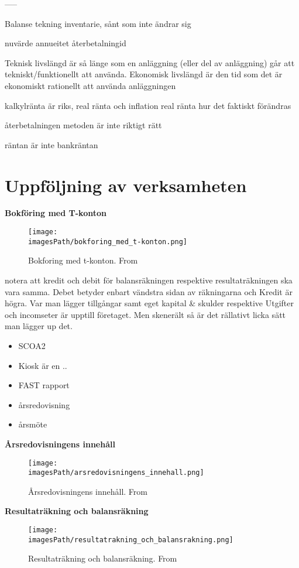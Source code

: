 -----

Balanse tekning
inventarie, sånt som inte ändrar sig

nuvärde
annueitet
återbetalningid

Teknisk livslängd är så länge som en anläggning (eller del av anläggning) går att tekniskt/funktionellt att använda. Ekonomisk livslängd är den tid som det är ekonomiskt rationellt att använda anläggningen


kalkylränta är riks, real ränta och inflation
real ränta hur det faktiskt förändras

återbetalningen metoden är inte riktigt rätt

räntan är inte bankräntan

\section{Uppföljning av verksamheten}

\textbf{Bokföring med T-konton}
\begin{figure}[!ht]
    \centering
    \texttt{[image: \\imagesPath/bokforing\_med\_t-konton.png]}
    \caption{Bokforing med t-konton. From \cite{}}
\end{figure}
notera att kredit och debit för balansräkningen respektive resultaträkningen ska vara samma.
Debet betyder enbart vändstra sidan av räkningarna och Kredit är högra.
Var man lägger tillgångar samt eget kapital \& skulder respektive Utgifter och incomseter är 
upptill företaget. Men skenerält så är det rällativt licka sätt man lägger up det.

\begin{itemize}
    \item SCOA2
    \item Kiosk är en ..
    \item FAST rapport
    \item årsredovisning
    \item årsmöte
\end{itemize}

\textbf{Årsredovisningens innehåll}
\begin{figure}[!ht]
    \centering
    \texttt{[image: \\imagesPath/arsredovisningens\_innehall.png]}
    \caption{Årsredovisningens innehåll. From \cite{}}
\end{figure}

\textbf{Resultaträkning och balansräkning}
\begin{figure}[!ht]
    \centering
    \texttt{[image: \\imagesPath/resultatrakning\_och\_balansrakning.png]}
    \caption{Resultaträkning och balansräkning. From \cite{}}
\end{figure}


